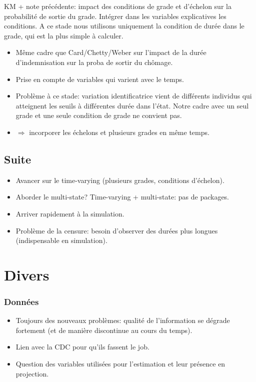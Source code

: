 \documentclass[11pt,a4paper]{article}
\begin{document}
KM + note précédente: impact des conditions de grade et d'échelon sur la probabilité de sortie du grade. Intégrer dans les variables explicatives les conditions. 
A ce stade nous utilisons uniquement la condition de durée dans le grade, qui est la plus simple à calculer. 

\begin{itemize}[leftmargin=1cm ,parsep=0cm,itemsep=0cm,topsep=0cm] 
\item Même cadre que Card/Chetty/Weber sur l'impact de la durée d'indemnisation sur la proba de sortir du chômage. 
\item Prise en compte de variables qui varient avec le temps. 
\item Problème à ce stade: variation identificatrice vient de différents individus qui atteignent les seuils à différentes durée dans l'état. Notre cadre avec un seul grade et une seule condition de grade ne convient pas. 
\item[] $\Rightarrow$ incorporer les échelons et plusieurs grades en même temps. 
\end{itemize}

\subsection*{Suite}

\begin{itemize}[leftmargin=1cm ,parsep=0cm,itemsep=0cm,topsep=0cm] 
\item Avancer sur le time-varying (plusieurs grades, conditions d'échelon). 
\item Aborder le multi-state? Time-varying + multi-state: pas de packages. 
\item Arriver rapidement à la simulation. 
\item Problème de la censure: besoin d'observer des durées plus longues (indispensable en simulation). 
\end{itemize}


\section{Divers}

\subsubsection*{Données}

\begin{itemize}[leftmargin=1cm ,parsep=0cm,itemsep=0cm,topsep=0cm] 
\item Toujours des nouveaux problèmes: qualité de l'information se dégrade fortement (et de manière discontinue au cours du temps). 
\item Lien avec la CDC pour qu'ils fassent le job. 
\item Question des variables utilisées pour l'estimation et leur présence en projection. 
\end{itemize}
\end{document}
